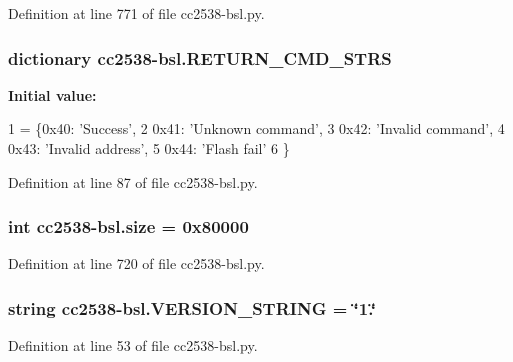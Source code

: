 Definition at line 771 of file cc2538-\/bsl.\+py.

\subsubsection[{\texorpdfstring{R\+E\+T\+U\+R\+N\+\_\+\+C\+M\+D\+\_\+\+S\+T\+RS}{RETURN_CMD_STRS}}]{\setlength{\rightskip}{0pt plus 5cm}dictionary cc2538-\/bsl.\+R\+E\+T\+U\+R\+N\+\_\+\+C\+M\+D\+\_\+\+S\+T\+RS}\hypertarget{namespacecc2538-bsl_a2e0f0c5f66be862bf98afbb209447a19}{}\label{namespacecc2538-bsl_a2e0f0c5f66be862bf98afbb209447a19}
{\bfseries Initial value\+:}
\begin{DoxyCode}
1 = \{0x40: \textcolor{stringliteral}{'Success'},
2                     0x41: \textcolor{stringliteral}{'Unknown command'},
3                     0x42: \textcolor{stringliteral}{'Invalid command'},
4                     0x43: \textcolor{stringliteral}{'Invalid address'},
5                     0x44: \textcolor{stringliteral}{'Flash fail'}
6                     \}
\end{DoxyCode}


Definition at line 87 of file cc2538-\/bsl.\+py.

\subsubsection[{\texorpdfstring{size}{size}}]{\setlength{\rightskip}{0pt plus 5cm}int cc2538-\/bsl.\+size = 0x80000}\hypertarget{namespacecc2538-bsl_a19ca7ec3da8c642fa507a248ce5f2ede}{}\label{namespacecc2538-bsl_a19ca7ec3da8c642fa507a248ce5f2ede}


Definition at line 720 of file cc2538-\/bsl.\+py.

\subsubsection[{\texorpdfstring{V\+E\+R\+S\+I\+O\+N\+\_\+\+S\+T\+R\+I\+NG}{VERSION_STRING}}]{\setlength{\rightskip}{0pt plus 5cm}string cc2538-\/bsl.\+V\+E\+R\+S\+I\+O\+N\+\_\+\+S\+T\+R\+I\+NG = \char`\"{}1.\char`\"{}}\hypertarget{namespacecc2538-bsl_a4f3168eb7c345d93d26768c21ae7d91f}{}\label{namespacecc2538-bsl_a4f3168eb7c345d93d26768c21ae7d91f}


Definition at line 53 of file cc2538-\/bsl.\+py.


